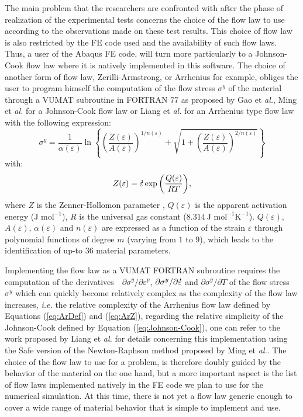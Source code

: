\documentclass[algorithms,article,submit,pdftex,moreauthors]{Definitions/mdpi}
\makeatletter
\DeclareRobustCommand{\mdot}[1]{\accentset{\mbox{\bfseries .}}{#1}}
\DeclareRobustCommand{\ie}{\emph{i.e.}\@\xspace}
\DeclareRobustCommand{\eal}{et \emph{al.}\@\xspace}
\makeatother
\begin{document}
The main problem that the researchers are confronted with after the phase of realization of the experimental tests concerns the choice of the flow law to use according to the observations made on these test results.
This choice of flow law is also restricted by the FE code used and the availability of such flow laws.
Thus, a user of the Abaqus FE code, will turn more particularly to a Johnson-Cook \cite{Johnson-1983} flow law where it is natively implemented in this software.
The choice of another form of flow law, Zerilli-Armstrong, or Arrhenius for example, obliges the user to program himself the computation of the flow stress $\sigma^y$ of the material through a VUMAT subroutine in FORTRAN 77 as proposed by Gao \eal \cite{Gao-2007-FRT}, Ming \eal \cite{Ming-2018} for a Johnson-Cook flow law or Liang \eal \cite{Liang-2022} for an Arrhenius type flow law with the following expression:
\begin{equation}
\sigma^y = \frac{1}{\alpha(\varepsilon)} \ln\left\{\left(\frac{Z(\varepsilon)}{A(\varepsilon)}\right)^{1/n(\varepsilon)} + \sqrt{1 + \left(\frac{Z(\varepsilon)}{A(\varepsilon)}\right)^{2/n(\varepsilon)}}\right\}
\label{eq:ArDef}
\end{equation}
with:
\begin{equation}
Z(\varepsilon) = \mdot\varepsilon \exp{\left(\frac{Q(\varepsilon)}{RT}\right)}, \label{eq:ArZ}
\end{equation}
where $Z$ is the Zenner-Hollomon parameter \cite{Zener-1944}, $Q(\varepsilon)$ is the apparent activation energy ($\text{J~mol}^{-1}$), $R$ is the universal gas constant ($8.314~\text{J~mol}^{-1} \text{K}^{-1}$).
$Q(\varepsilon)$, $A(\varepsilon)$, $\alpha(\varepsilon)$ and $n(\varepsilon)$ are expressed as a function of the strain $\varepsilon$ through polynomial functions of degree $m$ (varying from $1$ to $9$), which leads to the identification of up-to $36$ material parameters.

Implementing the flow law as a VUMAT FORTRAN subroutine requires the computation of the derivatives  $\partial\sigma^y/\partial\varepsilon^p$, $\partial\sigma^y/\partial\mdot\varepsilon$ and $\partial\sigma^y/\partial T$ of the flow stress $\sigma^y$ which can quickly become relatively complex as the complexity of the flow law increases, \ie the relative complexity of the Arrhenius flow law defined by Equations (\ref{eq:ArDef}) and (\ref{eq:ArZ}), regarding the relative simplicity of the Johnson-Cook defined by Equation (\ref{eq:Johnson-Cook}), one can refer to the work proposed by Liang \eal \cite{Liang-2022} for details concerning this implementation using the Safe version of the Newton-Raphson method proposed by Ming \eal \cite{Ming-2018}.
The choice of the flow law to use for a problem, is therefore doubly guided by the behavior of the material on the one hand, but a more important aspect is the list of flow laws implemented natively in the FE code we plan to use for the numerical simulation.
At this time, there is not yet a flow law generic enough to cover a wide range of material behavior that is simple to implement and use.
\end{document}
